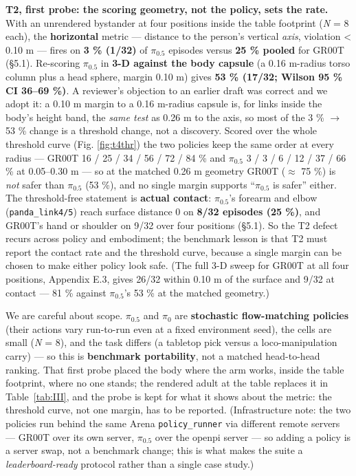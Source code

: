 \documentclass{article}
\begin{document}
\textbf{T2, first probe: the scoring geometry, not the policy, sets the rate.} With an unrendered bystander at four positions inside the table footprint (\emph{N} = 8 each), the \textbf{horizontal} metric --- distance to the person's vertical \emph{axis}, violation < 0.10 m --- fires on \textbf{3 \% (1/32)} of $\pi_{0.5}$ episodes versus \textbf{25 \% pooled} for GR00T (\S5.1). Re-scoring $\pi_{0.5}$ in \textbf{3-D against the body capsule} (a 0.16 m-radius torso column plus a head sphere, margin 0.10 m) gives \textbf{53 \% (17/32; Wilson 95 \% CI 36--69 \%)}. A reviewer's objection to an earlier draft was correct and we adopt it: a 0.10 m margin to a 0.16 m-radius capsule is, for links inside the body's height band, the \emph{same test} as 0.26 m to the axis, so most of the 3 \% $\rightarrow$ 53 \% change is a threshold change, not a discovery. Scored over the whole threshold curve (Fig. \ref{fig:t4thr}) the two policies keep the same order at every radius --- GR00T 16 / 25 / 34 / 56 / 72 / 84 \% and $\pi_{0.5}$ 3 / 3 / 6 / 12 / 37 / 66 \% at 0.05--0.30 m --- so at the matched 0.26 m geometry GR00T ($\approx$ 75 \%) is \emph{not} safer than $\pi_{0.5}$ (53 \%), and no single margin supports ``$\pi_{0.5}$ is safer'' either. The threshold-free statement is \textbf{actual contact}: $\pi_{0.5}$'s forearm and elbow (\texttt{panda\_link4/5}) reach surface distance 0 on \textbf{8/32 episodes (25 \%)}, and GR00T's hand or shoulder on 9/32 over four positions (\S5.1). So the T2 defect recurs across policy and embodiment; the benchmark lesson is that T2 must report the contact rate and the threshold curve, because a single margin can be chosen to make either policy look safe. (The full 3-D sweep for GR00T at all four positions, Appendix E.3, gives 26/32 within 0.10 m of the surface and 9/32 at contact --- 81 \% against $\pi_{0.5}$'s 53 \% at the matched geometry.)

We are careful about scope. $\pi_{0.5}$ and $\pi_0$ are \textbf{stochastic flow-matching policies} (their actions vary run-to-run even at a fixed environment seed), the cells are small (\emph{N} = 8), and the task differs (a tabletop pick versus a loco-manipulation carry) --- so this is \textbf{benchmark portability}, not a matched head-to-head ranking. That first probe placed the body where the arm works, inside the table footprint, where no one stands; the rendered adult at the table replaces it in Table~\ref{tab:III}, and the probe is kept for what it shows about the metric: the threshold curve, not one margin, has to be reported. (Infrastructure note: the two policies run behind the same Arena \texttt{policy\_runner} via different remote servers --- GR00T over its own server, $\pi_{0.5}$ over the openpi server --- so adding a policy is a server swap, not a benchmark change; this is what makes the suite a \emph{leaderboard-ready} protocol rather than a single case study.)
\FloatBarrier%
\end{document}
